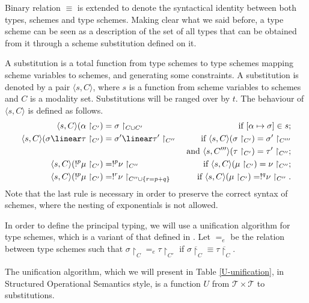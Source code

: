 Binary relation $\equiv$ is extended to denote the syntactical
identity between both types, schemes and type schemes.  Making clear what we
said before, a type scheme can be seen as a description of the set of
all types that can be obtained from it through a scheme
substitution defined on it. 
\medskip

A substitution is a total function from type schemes to type schemes mapping scheme variables 
to schemes, and generating some constraints. 
A substitution is denoted by a pair 
$\langle s,C\rangle$, where $s$ is a function from scheme variables to schemes and $C$ is a modality set. 
Substitutions will be ranged over by $t$. 
The behaviour of $\langle s,C\rangle$ is defined as follows.
\begin{align*}
    \langle s,C\rangle(\alpha\restriction_{C'}) &=\sigma\restriction_{C \cup C'} &\mbox{    if    } [\alpha \mapsto \sigma]\in s;\\
    \langle s,C\rangle (\sigma \linear \tau\restriction_{C'})& =\sigma' \linear \tau'\restriction_{C''} &\mbox{    if    } 
    \langle s,C\rangle(\sigma\restriction_{C'})=
    \sigma'\restriction_{C'''} \\
    & &\mbox{    and    } \langle s,C'''\rangle(\tau\restriction_{C'})=
    \tau'\restriction_{C''};\\
    \langle s,C\rangle (!^{p}\mu\restriction_{C'})&=!^{p}\nu\restriction_{C''} & \mbox{    if    }\langle s,C\rangle
    (\mu\restriction_{C'})=\nu\restriction_{C''};\\
    \langle s,C\rangle (!^{p}\mu\restriction_{C'})&=!^{r}\nu\restriction_{C''\cup \{r=p+q\}} & \mbox{    if    }
    \langle s,C\rangle(\mu\restriction_{C'})=!^{q}\nu\restriction_{C''} .
  \end{align*}
  Note that the last rule is necessary in order to preserve the 
  correct syntax of schemes, where the nesting of exponentials is not allowed. 

  In order to define the principal typing, we will use a unification
algorithm for type schemes, which is a variant of that defined in
\cite{Coppola03tlca}.  Let $=_e$ be the relation between type schemes
such that $\sigma\restriction_{C} =_{e}\tau\restriction_{C'}$ if $\overline{\sigma\restriction_{C}}\equiv \overline{\tau\restriction_{C}}$.

The unification algorithm, which we will present in Table
\ref{U-unification}, in Structured Operational Semantics style, is a function $U$ from $\mathcal{T}\times\mathcal{T}$
to substitutions.





